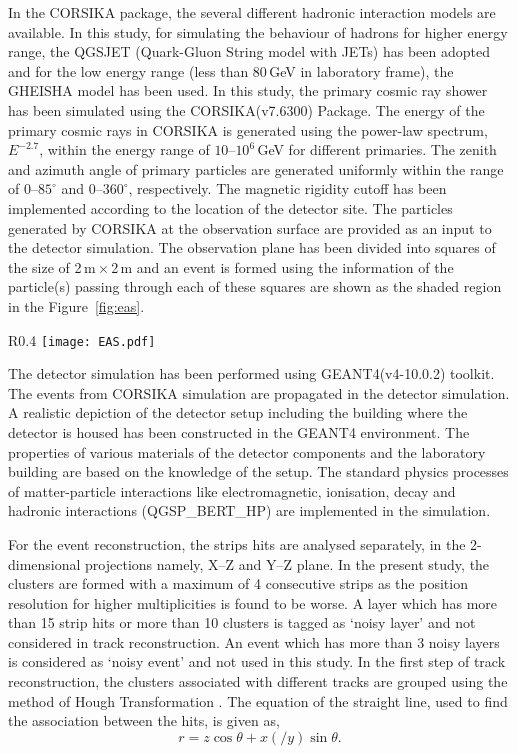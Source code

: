 In the CORSIKA package, the several different hadronic interaction
models are available. In this study, for simulating the behaviour of
hadrons for higher energy range, the QGSJET (Quark-Gluon String model
with JETs) \cite{corsika763} has been adopted and for the low energy
range (less than 80\,GeV in laboratory frame), the GHEISHA model has
been used. In this study, the primary cosmic ray shower has been
simulated using the CORSIKA(v7.6300) Package. The energy of the
primary cosmic rays in CORSIKA is generated using the power-law
spectrum, $E^{-2.7}$, within the energy range of
\mbox{$10$--$10^{6}$\,GeV} for different primaries. The zenith and
azimuth angle of primary particles are generated uniformly within the
range of \mbox{$0$--$85^\circ$} and \mbox{$0$--$360^\circ$},
respectively. The magnetic rigidity cutoff has been implemented
according to the location of the detector site. The particles
generated by CORSIKA at the observation surface are provided as an
input to the detector simulation. The observation plane has been
divided into squares of the size of 2\,m\,$\times$\,2\,m and an event
is formed using the information of the particle(s) passing through
each of these squares are shown as the shaded region in the
Figure~\ref{fig:eas}.
\begin{wrapfigure}{R}{0.4\linewidth}
  \centering
  \texttt{[image: EAS.pdf]} 
  \caption{Shower of particles initiated by primary cosmic ray
    reaching observation surface.}
  \label{fig:eas}
\end{wrapfigure}

The detector simulation has been performed using GEANT4(v4-10.0.2)
toolkit. The events from CORSIKA simulation are propagated in the
detector simulation. A realistic depiction of the detector setup
including the building where the detector is housed has been
constructed in the GEANT4 environment. The properties of various
materials of the detector components and the laboratory building are
based on the knowledge of the setup. The standard physics processes of
matter-particle interactions like electromagnetic, ionisation, decay
and hadronic interactions (QGSP\_BERT\_HP) are implemented in the
simulation.

For the event reconstruction, the strips hits are analysed separately,
in the 2-dimensional projections namely, \mbox{X--Z} and \mbox{Y--Z}
plane. In the present study, the clusters are formed with a maximum of
4 consecutive strips as the position resolution for higher
multiplicities is found to be worse. A layer which has more than 15
strip hits or more than 10 clusters is tagged as `noisy layer' and not
considered in track reconstruction. An event which has more than 3
noisy layers is considered as `noisy event' and not used in this
study. In the first step of track reconstruction, the clusters
associated with different tracks are grouped using the method of Hough
Transformation \cite{hought}. The equation of the straight line, used
to find the association between the hits, is given as,
\begin{equation}
  r=z\cos\theta+x\left(/y\right)\sin\theta. \label{eq:hough}
\end{equation}


